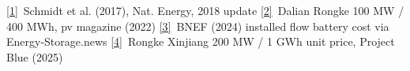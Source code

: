 \href{https://doi.org/10.1038/nenergy.2017.110}{[1]}~Schmidt et al. (2017), Nat. Energy, 2018 update\quad
\href{https://www.pv-magazine.com/2022/09/29/china-connects-worlds-largest-redox-flow-battery-system-to-grid/}{[2]}~Dalian Rongke 100 MW / 400 MWh, pv magazine (2022)\quad
\href{https://www.energy-storage.news/invinity-leverages-china-partnership-for-flow-battery-cost-reduction-supply-chain-advantages/}{[3]}~BNEF (2024) installed flow battery cost via Energy-Storage.news\quad
\href{https://projectblue.com/blue/news-analysis/1389/hype-fades-as-the-future-of-vanadium-flow-batteries-grows-uncertain}{[4]}~Rongke Xinjiang 200 MW / 1 GWh unit price, Project Blue (2025)

